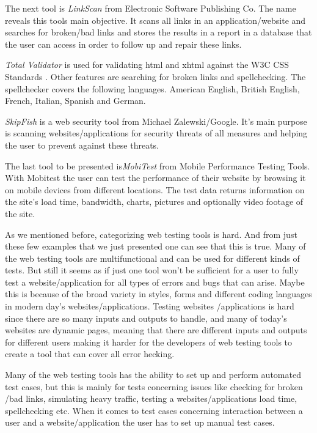 \documentclass[a4paper]{article}
\begin{document}
The next tool is \emph{LinkScan} from Electronic Software Publishing Co. The name reveals this tools main objective. It scans all 
links in an application/website and searches for broken/bad links and stores the results in a report in a database that the 
user can access in order to follow up and repair these links. \cite{links} 
 
\emph {Total Validator} is used for validating html and xhtml against the W3C CSS Standards \cite{w3}. Other features are searching 
for broken links and spellchecking. The spellchecker covers the following languages. American English, British English,
French, Italian, Spanish and German.\cite{totval} 

\emph {SkipFish} is a web security tool from Michael Zalewski/Google. It's main purpose is scanning websites/applications for 
security threats of all measures and helping the user to prevent against these threats. \cite{skipfish}
 
The last tool to be presented is\emph {MobiTest} from Mobile Performance Testing Tools.  With Mobitest the user can test the 
performance of their website by browsing it on mobile devices from different locations. The test data returns information 
on the site’s load time, bandwidth, charts, pictures and optionally video footage of the site. \cite{mobitest} 
 
 
As we mentioned before, categorizing web testing tools is hard. And from just these few examples that we just presented 
one can see that this is true. Many of the web testing tools are multifunctional and can be used for different kinds of 
tests. But still it seems as if just one tool won’t be sufficient for a user to fully test a website/application for all 
types of errors and bugs that can arise. Maybe this is because of the broad variety in styles, forms and different coding 
languages in modern day’s websites/applications.  Testing websites /applications is hard since there are so many inputs 
and outputs to handle, and many of today’s websites are dynamic pages, meaning that there are different inputs and outputs 
for different users making it harder for the developers of web testing tools to create a tool that can cover all error hecking.
  
Many of the web testing tools has the ability to set up and perform automated test cases, but this is mainly for tests 
concerning issues like checking for broken /bad links, simulating heavy traffic, testing a websites/applications load 
time, spellchecking etc. When it comes to test cases concerning interaction between a user and a website/application 
the user has to set up manual test cases.   
 
\end{document}
